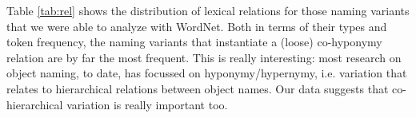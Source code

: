 Table \ref{tab:rel} shows the distribution of lexical relations for those naming variants that we were able to analyze with WordNet.
Both in terms of their types and token frequency, the naming variants that instantiate a (loose) co-hyponymy relation are by far the most frequent.
This is really interesting: most research on object naming, to date, has focussed on hyponymy/hypernymy, i.e. variation that relates to hierarchical relations between object names.
Our data suggests that co-hierarchical variation is really important too.





